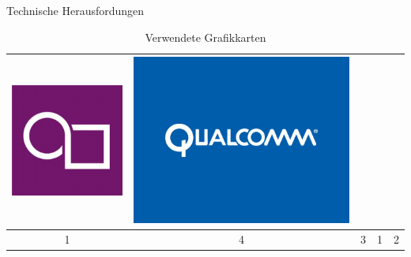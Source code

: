 \begin{frame}{Technische Herausfordungen}
\begin{table}[h]
\begin{tabular}{c|c|c|c|c}
		\includegraphics[width=\textwidth, height=0.1\textheight, keepaspectratio]{images/powerVR-logo} &
		\includegraphics[width=\textwidth, height=0.1\textheight, keepaspectratio]{images/qualcomm-logo} \\ \hline
		1 & 4 & 3 & 1 & 2
	\end{tabular}
	\caption{Verwendete Grafikkarten}
\end{table}
\end{frame}


